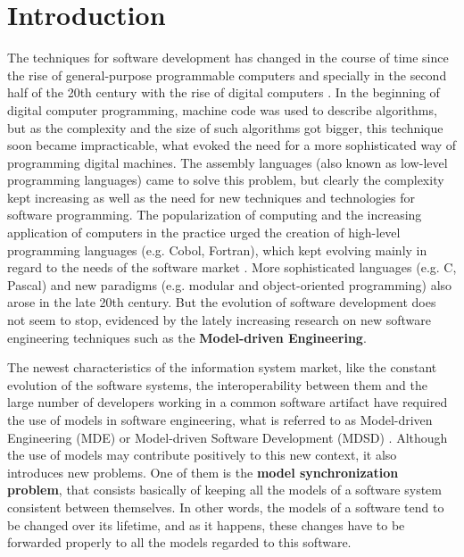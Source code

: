 \documentclass[tuberlin,cic,tc,english,noabntcite, oneside]{iiufrgs}
\begin{document}
\chapter{Introduction}
The techniques for software development has changed in the course of time since the rise of general-purpose programmable computers and specially in the second half of the 20th century with the rise of digital computers \citep{ceruzzi2003history}. In the beginning of digital computer programming, machine code was used to describe algorithms, but as the complexity and the size of such algorithms got bigger, this technique soon became impracticable, what evoked the need for a more sophisticated way of programming digital machines. The assembly languages (also known as low-level programming languages) came to solve this problem, but clearly the complexity kept increasing as well as the need for new techniques and technologies for software programming. The popularization of computing and the increasing application of computers in the practice urged the creation of high-level programming languages (e.g. Cobol, Fortran), which kept evolving mainly in regard to the needs of the software market \citep{ceruzzi2003history}. More sophisticated languages (e.g. C, Pascal) and new paradigms (e.g. modular and object-oriented programming) also arose in the late 20th century. But the evolution of software development does not seem to stop, evidenced by the lately increasing research on new software engineering techniques such as the \textbf{Model-driven Engineering}.

The newest characteristics of the information system market, like the constant evolution of the software systems, the interoperability between them and the large number of developers working in a common software artifact have required the use of models in software engineering, what is referred to as Model-driven Engineering (MDE) or Model-driven Software Development (MDSD) \citep{france2007model}. Although the use of models may contribute positively to this new context, it also introduces new problems. One of them is the \textbf{model synchronization problem}, that consists basically of keeping all the models of a software system consistent between themselves. In other words, the models of a software tend to be changed over its lifetime, and as it happens, these changes have to be forwarded properly to all the models regarded to this software.

\end{document}
